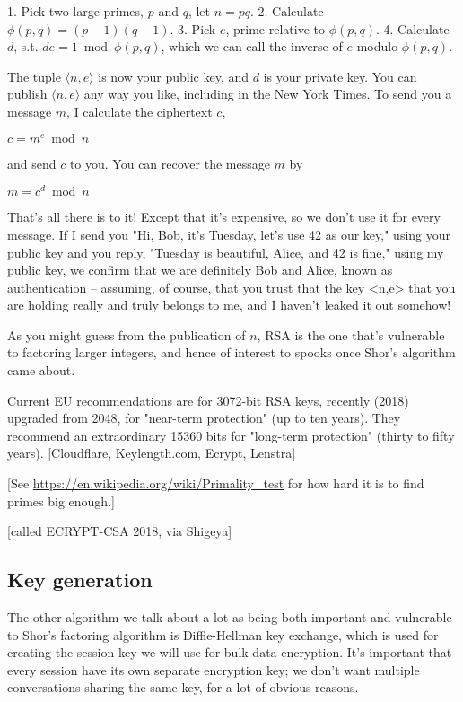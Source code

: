 \documentclass[%
 aip,
 jmp,%
 amsmath,amssymb,
 reprint,%
]{revtex4-1}
\begin{document}
	1. Pick two large primes, $p$ and $q$, let $n = pq$.
	2. Calculate $\phi(p,q) = (p-1)(q-1)$.
	3. Pick $e$, prime relative to $\phi(p,q)$.
	4. Calculate $d$, s.t. $de = 1 \bmod \phi(p,q)$,
	   which we can call the inverse of $e$ modulo $\phi(p,q)$.

The tuple $\langle n,e\rangle$ is now your public key, and $d$ is your private key.
You can publish $\langle n,e\rangle$ any way you like, including in the New York
Times. To send you a message $m$, I calculate the ciphertext $c$,

	$c = m^e \bmod n$

and send $c$ to you.  You can recover the message $m$ by

    	$m = c^d \bmod n$

That's all there is to it!  Except that it's expensive, so we don't
use it for every message.  If I send you "Hi, Bob, it's Tuesday, let's
use 42 as our key," using your public key and you reply, "Tuesday is
beautiful, Alice, and 42 is fine," using my public key, we confirm
that we are definitely Bob and Alice, known as authentication --
assuming, of course, that you trust that the key <n,e> that you are
holding really and truly belongs to me, and I haven't leaked it out
somehow!

As you might guess from the publication of $n$, RSA is the one that's
vulnerable to factoring larger integers, and hence of interest to
spooks once Shor's algorithm came about.

Current EU recommendations are for 3072-bit RSA keys, recently (2018)
upgraded from 2048, for "near-term protection" (up to ten years).
They recommend an extraordinary 15360 bits for "long-term protection"
(thirty to fifty years). [Cloudflare, Keylength.com, Ecrypt, Lenstra]

[See \url{https://en.wikipedia.org/wiki/Primality_test} for how hard it is
to find primes big enough.]

[called ECRYPT-CSA 2018, via Shigeya]

\subsection{Key generation}

The other algorithm we talk about a lot as being both important and
vulnerable to Shor's factoring algorithm is Diffie-Hellman key
exchange, which is used for creating the session key we will use for
bulk data encryption.  It's important that every session have its own
separate encryption key; we don't want multiple conversations sharing
the same key, for a lot of obvious reasons.
\end{document}

